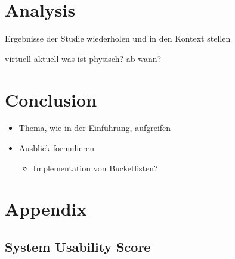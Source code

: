\documentclass[12pt,numbers=noenddot,parskip,bibliography=totocnumbered,listof=totocnumbered,draft]{scrreprt}
\begin{document}
\chapter{Analysis}
Ergebnisse der Studie wiederholen und in den Kontext stellen

virtuell aktuell was ist physisch? ab wann?

\chapter{Conclusion}
\begin{itemize} 
	\item Thema, wie in der Einführung, aufgreifen
	\item Ausblick formulieren
	\begin{itemize} 
		\item Implementation von Bucketlisten?
	\end{itemize} 
\end{itemize} 

\appendix
\chapter{Appendix}

\newpage
\section{System Usability Score}
\vfill
{}
\label{sus}
\vfill
\end{document}
